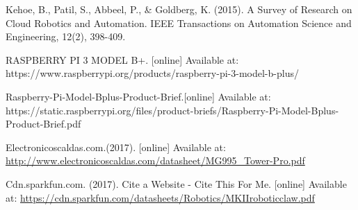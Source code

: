 \documentclass[conference]{IEEEtran}
\begin{document}
\begin{thebibliography}{1}
Kehoe, B., Patil, S., Abbeel, P., \& Goldberg, K. (2015). A Survey of Research on Cloud Robotics and Automation. IEEE Transactions on Automation Science and Engineering, 12(2), 398-409.

RASPBERRY PI 3 MODEL B+. [online] Available at: https://www.raspberrypi.org/products/raspberry-pi-3-model-b-plus/

Raspberry-Pi-Model-Bplus-Product-Brief.[online] Available at: https://static.raspberrypi.org/files/product-briefs/Raspberry-Pi-Model-Bplus-Product-Brief.pdf

Electronicoscaldas.com.(2017). [online] Available at: \url{http://www.electronicoscaldas.com/datasheet/MG995_Tower-Pro.pdf}

Cdn.sparkfun.com. (2017). Cite a Website - Cite This For Me. [online] Available at: \url{https://cdn.sparkfun.com/datasheets/Robotics/MKIIroboticclaw.pdf}


\end{thebibliography}




\end{document}
